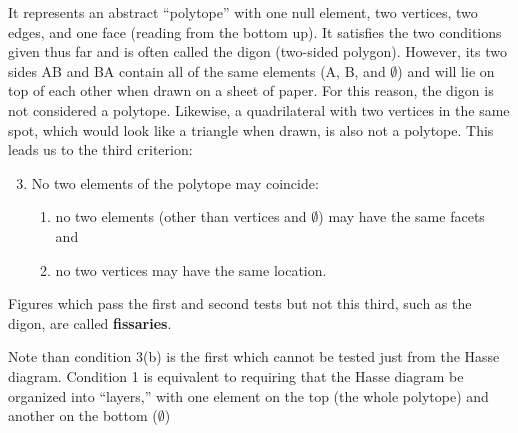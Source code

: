 \documentclass{article}
\begin{document}
It represents an abstract ``polytope'' with
one null element, two vertices, two edges, and one face (reading from the bottom up).
It satisfies the two conditions given thus far and is often called the digon (two-sided polygon).
However, its two sides AB and BA contain all of the same elements (A, B, and $\emptyset$)
and will lie on top of each other when drawn on a sheet of paper.
For this reason, the digon is not considered a polytope.
Likewise, a quadrilateral with two vertices in the same spot,
which would look like a triangle when drawn, is also not a polytope.
This leads us to the third criterion:

\begin{enumerate}
  \setcounter{enumi}{2}
\item No two elements of the polytope may coincide:
  \begin{enumerate}
  \item no two elements (other than vertices and $\emptyset$) may have the same facets and
  \item no two vertices may have the same location.
  \end{enumerate}
\end{enumerate}

Figures which pass the first and second tests but not this third,
such as the digon, are called \textbf{fissaries}.

Note than condition 3(b) is the first which cannot be tested just from the Hasse diagram.
Condition 1 is equivalent to requiring that the Hasse diagram be organized into ``layers,''
with one element on the top (the whole polytope) and another on the bottom ($\emptyset$)



\end{document}

